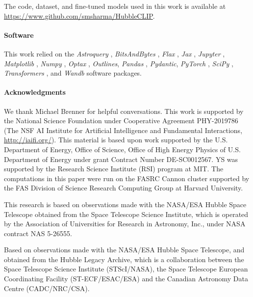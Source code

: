 \documentclass[10pt]{article} %
\newcommand{\package}[1]{\textsl{#1}\xspace}
\begin{document}
The code, dataset, and fine-tuned models used in this work is available at \url{https://www.github.com/smsharma/HubbleCLIP}.

\paragraph*{Software}

This work relied on the \package{Astroquery} \citep{2019AJ....157...98G}, \package{BitsAndBytes} \citep{dettmers2022llmint8}, \package{Flax} \citep{flax2020github}, \package{Jax} \citep{jax2018github}, \package{Jupyter} \citep{Kluyver2016jupyter}, \package{Matplotlib} \citep{Hunter:2007}, \package{Numpy} \citep{harris2020array}, \package{Optax} \citep{deepmind2020jax}, \package{Outlines}, \package{Pandas} \citep{2020SciPy-NMeth}, \package{Pydantic}, \package{PyTorch} \citep{paszke2019pytorch}, \package{SciPy} \citep{2020SciPy-NMeth}, \package{Transformers} \citep{wolf2019huggingface}, and \package{Wandb} \citep{wandb} software packages.



\paragraph*{Acknowledgments}

We thank Michael Brenner for helpful conversations.
%
This work is supported by the National Science Foundation under Cooperative Agreement PHY-2019786 (The NSF AI Institute for Artificial Intelligence and Fundamental Interactions, \url{http://iaifi.org/}).
%
This material is based upon work supported by the U.S. Department of Energy, Office of Science, Office of High Energy Physics of U.S. Department of Energy under grant Contract Number  DE-SC0012567. 
%
YS was supported by the Research Science Institute (RSI) program at MIT.
%
The computations in this paper were run on the FASRC Cannon cluster supported by the FAS Division of Science Research Computing Group at Harvard University.

This research is based on observations made with the NASA/ESA Hubble Space Telescope obtained from the Space Telescope Science Institute, which is operated by the Association of Universities for Research in Astronomy, Inc., under NASA contract NAS 5-26555.

Based on observations made with the NASA/ESA Hubble Space Telescope, and obtained from the Hubble Legacy Archive, which is a collaboration between the Space Telescope Science Institute (STScI/NASA), the Space Telescope European Coordinating Facility (ST-ECF/ESAC/ESA) and the Canadian Astronomy Data Centre (CADC/NRC/CSA).
\end{document}
